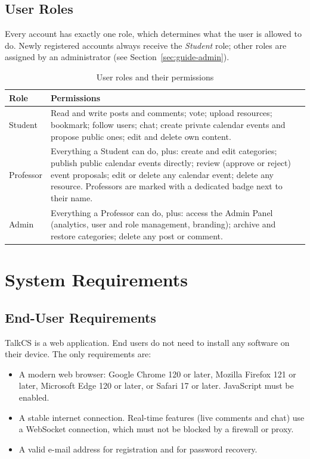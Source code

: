 \subsection{User Roles}
\label{sec:roles}

Every account has exactly one role, which determines what the user is allowed to do.
Newly registered accounts always receive the \emph{Student} role; other roles are
assigned by an administrator (see Section~\ref{sec:guide-admin}).

\begin{table}[H]
  \centering
  \small
  \begin{tabularx}{\textwidth}{@{}l X@{}}
    \toprule
    \textbf{Role} & \textbf{Permissions} \\
    \midrule
    Student & Read and write posts and comments; vote; upload resources; bookmark;
      follow users; chat; create private calendar events and propose public ones;
      edit and delete own content. \\
    Professor & Everything a Student can do, plus: create and edit categories; publish
      public calendar events directly; review (approve or reject) event proposals;
      edit or delete any calendar event; delete any resource. Professors are marked
      with a dedicated badge next to their name. \\
    Admin & Everything a Professor can do, plus: access the Admin Panel (analytics,
      user and role management, branding); archive and restore categories; delete any
      post or comment. \\
    \bottomrule
  \end{tabularx}
  \caption{User roles and their permissions}
  \label{tab:roles}
\end{table}

\section{System Requirements}

\subsection{End-User Requirements}

TalkCS is a web application. End users do not need to install any software on their
device. The only requirements are:

\begin{itemize}
  \item A modern web browser: Google Chrome 120 or later, Mozilla Firefox 121 or later,
    Microsoft Edge 120 or later, or Safari 17 or later. JavaScript must be enabled.
  \item A stable internet connection. Real-time features (live comments and chat) use a
    WebSocket connection, which must not be blocked by a firewall or proxy.
  \item A valid e-mail address for registration and for password recovery.
\end{itemize}

